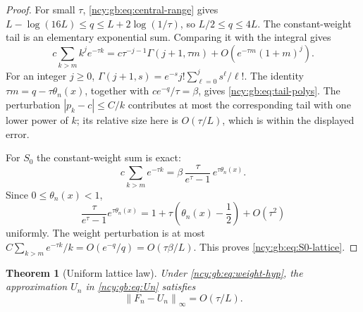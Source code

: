 \documentclass[11pt,letterpaper]{article}
\numberwithin{equation}{section}
\newtheorem{theorem}{Theorem}[section]
\theoremstyle{remark}\newtheorem{remark}[theorem]{Remark}
\theoremstyle{definition}\newtheorem{definition}[theorem]{Definition}\theoremstyle{plain}
\newcommand{\norminf}[1]{\left\lVert #1\right\rVert_\infty}
\begin{document}
\begin{proof}
For small \(\tau\), \eqref{ncy:gb:eq:central-range} gives
\(L-\log(16L)\le q\le L+2\log(1/\tau)\), so \(L/2\le q\le4L\).
The constant-weight tail is an elementary exponential sum. Comparing it
with the integral gives
\[
 c\sum_{k>m}k^je^{-\tau k}
 =c\tau^{-j-1}\Gamma(j+1,\tau m)
 +O\left(e^{-\tau m}(1+m)^j\right).
\]
For an integer \(j\ge0\),
\(\Gamma(j+1,s)=e^{-s}j!\sum_{\ell=0}^j s^\ell/\ell!\).
The identity \(\tau m=q-\tau\theta_n(x)\), together with
\(ce^{-q}/\tau=\beta\), gives \eqref{ncy:gb:eq:tail-polys}.
The perturbation \(|p_k-c|\le C/k\) contributes at most the
corresponding tail with one lower power of \(k\); its relative
size here is \(O(\tau/L)\), which is within the displayed error.

For \(S_0\) the constant-weight sum is exact:
\begin{equation}\label{ncy:gb:eq:exact-geometric-tail}
 c\sum_{k>m}e^{-\tau k}
 =\beta\,\frac{\tau}{e^\tau-1}\,e^{\tau\theta_n(x)}.
\end{equation}
Since \(0\le\theta_n(x)<1\),
\[
 \frac{\tau}{e^\tau-1}e^{\tau\theta_n(x)}
 =1+\tau\left(\theta_n(x)-\frac12\right)+O(\tau^2)
\]
uniformly. The weight perturbation is at most
\(C\sum_{k>m}e^{-\tau k}/k=O(e^{-q}/q)=O(\tau\beta/L)\).
This proves \eqref{ncy:gb:eq:S0-lattice}.
\end{proof}

\begin{theorem}[Uniform lattice law]\label{ncy:gb:thm:lattice}
Under \eqref{ncy:gb:eq:weight-hyp}, the approximation \(U_n\) in
\eqref{ncy:gb:eq:Un} satisfies
\begin{equation}\label{ncy:gb:eq:lattice-bound}
 \norminf{F_n-U_n}=O(\tau/L).
\end{equation}
\end{theorem}
\end{document}
